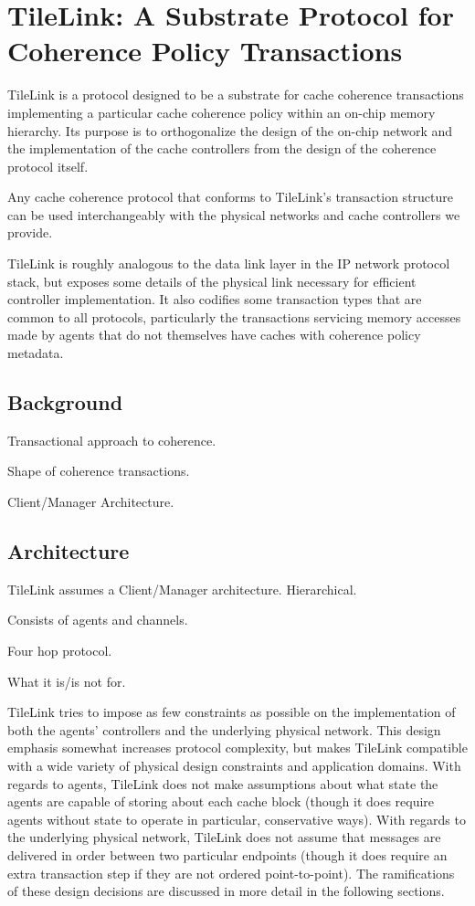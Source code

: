 \chapter{TileLink: A Substrate Protocol for Coherence Policy Transactions }
\label{c.tilelink}

TileLink is a protocol designed to be a substrate for cache coherence transactions implementing a particular cache coherence policy within an on-chip memory hierarchy.
Its purpose is to orthogonalize the design of the on-chip network and the implementation of the cache controllers from the design of the coherence protocol itself.

Any cache coherence protocol that conforms to TileLink's transaction structure can be used interchangeably with the physical networks and cache controllers we provide.

TileLink is roughly analogous to the data link layer in the IP network protocol stack, but exposes some details of the physical link necessary for efficient controller implementation.
It also codifies some transaction types that are common to all protocols, particularly the transactions servicing memory accesses made by agents that do not themselves have caches with coherence policy metadata.

\section{Background}

Transactional approach to coherence.

Shape of coherence transactions.

Client/Manager Architecture.

\section{Architecture}
\label{s.arch}

TileLink assumes a Client/Manager architecture.
Hierarchical.

Consists of agents and channels.

Four hop protocol.

What it is/is not for. 

TileLink tries to impose as few constraints as possible on the implementation of both the agents' controllers and the underlying physical network.
This design emphasis somewhat increases protocol complexity, but makes TileLink compatible with a wide variety of physical design constraints and application domains.
With regards to agents, TileLink does not make assumptions about what state the agents are capable of storing about each cache block (though it does require agents without state to operate in particular, conservative ways).
With regards to the underlying physical network, TileLink does not assume that messages are delivered in order between two particular endpoints (though it does require an extra transaction step if they are not ordered point-to-point).
The ramifications of these design decisions are discussed in more detail in the following sections.

